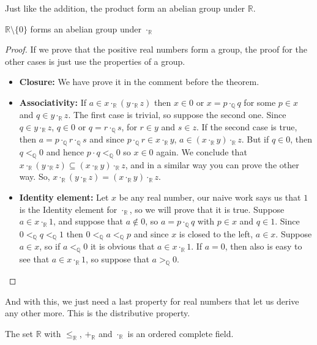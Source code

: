 \documentclass{tufte-handout}
\begin{document}
Just like the addition, the product form an abelian group under $\mathbb{R}$.
\begin{theorem}
	$\mathbb{R} \setminus \{0\}$ forms an abelian group under $\cdot_\mathbb{R}$
\end{theorem}
\begin{proof}
	If we prove that the positive real numbers form a group, the proof for the other cases is just use the properties of a group. 
	\begin{itemize}
		\item \textbf{Closure:} We have prove it in the comment before the theorem.
		\item \textbf{Associativity:} If $a \in x \cdot_\mathbb{R} (y \cdot_\mathbb{R} z)$ then $x \in 0$ or $x = p \cdot_\mathbb{Q} q$ for some $p \in x$ and $q \in y \cdot_\mathbb{R} z$. The first case is trivial, so suppose the second one. Since $q \in y \cdot_\mathbb{R} z$, $q \in 0$ or $q = r \cdot_\mathbb{Q} s$, for $r \in y$ and $s \in z$. If the second case is true, then $a = p \cdot_\mathbb{Q} r \cdot_\mathbb{Q} s$ and since $p \cdot_\mathbb{Q} r \in x \cdot_\mathbb{R} y$, $a \in (x \cdot_\mathbb{R} y) \cdot_\mathbb{R} z$. But if $q \in 0$, then $q <_\mathbb{Q} 0$ and hence $p \cdot q <_\mathbb{Q} 0$ so $x \in 0$ again. We conclude that $x \cdot_\mathbb{R} (y \cdot_\mathbb{R} z) \subseteq (x \cdot_\mathbb{R} y) \cdot_\mathbb{R} z$, and in a similar way you can prove the other way. So, $x \cdot_\mathbb{R} (y \cdot_\mathbb{R} z) = (x \cdot_\mathbb{R} y) \cdot_\mathbb{R} z$.
		\item \textbf{Identity element:} Let $x$ be any real number, our naive work says us that $1$ is the Identity element for $\cdot_\mathbb{R}$, so we will prove that it is true. Suppose $a \in x \cdot_\mathbb{R} 1$, and suppose that $a \not \in 0$, so $a = p \cdot_\mathbb{Q} q$ with $p \in x$ and $q \in 1$. Since $0 <_\mathbb{Q} q <_\mathbb{Q} 1$ then $0 <_\mathbb{Q} a <_\mathbb{Q} p$ and since $x$ is closed to the left, $a \in x$. Suppose $a \in x$, so if $a <_\mathbb{Q} 0$ it is obvious that $a \in x \cdot_\mathbb{R} 1$. If $a = 0$, then also is easy to see that $a \in x \cdot_\mathbb{R}1$, so suppose that $a >_\mathbb{Q} 0$.  
	\end{itemize}
\end{proof}

And with this, we just need a last property for real numbers that let us derive any other more. This is the distributive property.

\begin{theorem}
	The set $\mathbb{R}$ with $\le_\mathbb{R}$, $+_\mathbb{R}$ and $\cdot_\mathbb{R}$ is an ordered complete field.
\end{theorem}
\end{document}
